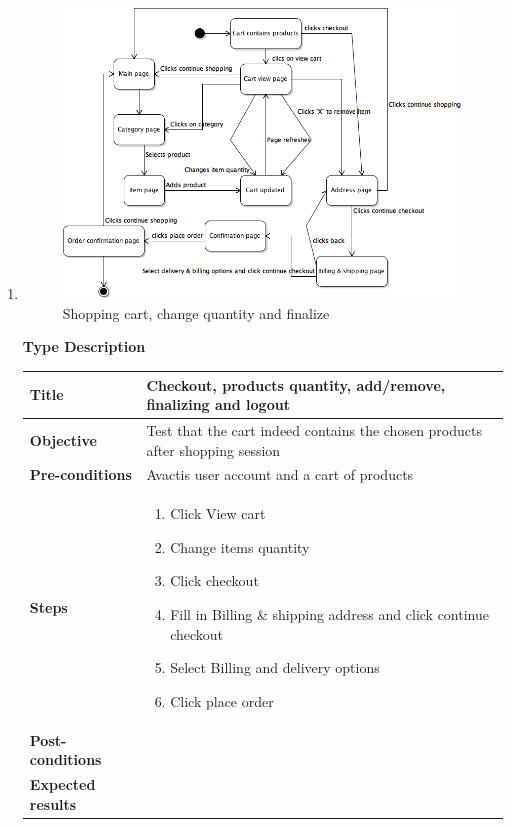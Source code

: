 \documentclass[UKenglish,12pt]{article}
\begin{document}
\begin{enumerate}
\item %
\begin{figure}[!h]
\centering
\includegraphics[scale=0.60,keepaspectratio]{Images/BuyProductsandChangeCart.png}
\caption{Shopping cart, change quantity and finalize}
\end{figure}
\newpage
\textbf{\hspace{0.3cm}Type\hspace{4.4cm} Description}
\newline \vspace{0.2cm}
\begin{tabular}{| p{5cm} | p{10cm} | }
	\hline
	 \textbf{Title} & Checkout, products quantity, add/remove, finalizing and logout \\ \hline
	 \textbf{Objective} & Test that the cart indeed contains the chosen products after shopping session \\ \hline
	 \textbf{Pre-conditions} & Avactis user account and a cart of products \\ \hline
	 \textbf{Steps} & \begin{enumerate} \item Click View cart \item Change items quantity \item Click checkout \item Fill in Billing \& shipping address and click continue checkout \item Select Billing and delivery options \item Click place order
	 \end{enumerate} \\ \hline
	 \textbf{Post-conditions} & \\ \hline
	 \textbf{Expected results} & \\ 
	 \hline
\end{tabular} %




\end{enumerate}
\end{document}
